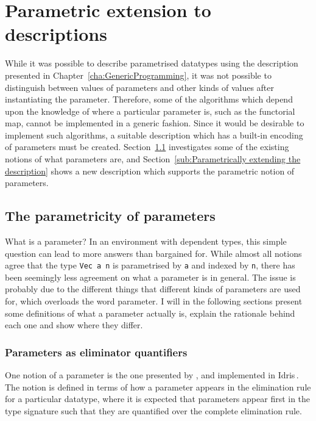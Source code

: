 \documentclass{ituthesis}
\newcommand{\tttype}[1]{\textcolor{type-color}{\texttt{#1}}}
\newcommand{\ttvar}[1]{\textcolor{local-var-color}{\texttt{#1}}}
\theoremstyle{break}
\begin{document}
\section{Parametric extension to descriptions}
\label{sec:Parametricextensiontodescriptions}

While it was possible to describe parametrised datatypes using the description presented in Chapter~\ref{cha:GenericProgramming}, it was not possible to distinguish
between values of parameters and other kinds of values after instantiating the parameter.
Therefore, some of the algorithms which depend upon the knowledge of where a particular parameter is, such as the functorial map,
cannot be implemented in a generic fashion.
Since it would be desirable to implement such algorithms, a suitable description which has a built-in encoding of parameters must be created.
Section~\ref{sub:The parametricity of parameters} investigates some of the existing notions of what parameters are, and Section~\ref{sub:Parametrically extending the description} shows a new description which supports
the parametric notion of parameters.

\subsection{The parametricity of parameters}
\label{sub:The parametricity of parameters}
What is a parameter?
In an environment with dependent types, this simple question can lead to more answers than bargained for.
While almost all notions agree that the type \tttype{Vec}~\ttvar{a}~\ttvar{n} is parametrised by \ttvar{a} and indexed by \ttvar{n}, there has been seemingly less agreement on what a parameter is in general.
The issue is probably due to the different things that different kinds of parameters are used for, which overloads the word parameter.
I will in the following sections present some definitions of what a parameter actually is, explain the rationale behind each one and show where they differ.

\subsubsection{Parameters as eliminator quantifiers}
\label{ssub:Parameters as eliminator quantifiers}
One notion of a parameter is the one presented by \textcite{Dybjer97inductivefamilies}, and implemented in Idris\,\autocite{brady2013idris}.
The notion is defined in terms of how a parameter appears in the elimination rule for a particular datatype, where it is expected that parameters appear first in the type signature such that they are quantified over the complete elimination rule.
\end{document}
